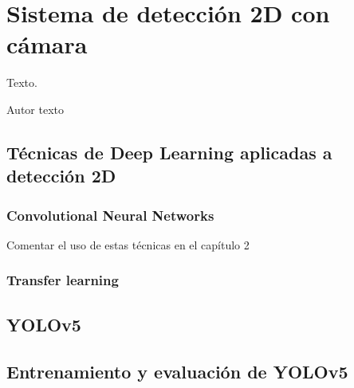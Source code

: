 \chapter{Sistema de detección 2D con cámara}
\label{cha:Sistema de detección 2D con cámara}

\begin{FraseCelebre}
  \begin{Frase}
    Texto.
  \end{Frase}
  \begin{Fuente}
    Autor texto
  \end{Fuente}
\end{FraseCelebre}

\section{Técnicas de Deep Learning aplicadas a detección 2D}
\label{sec:Técnicas de Deep Learning aplicadas a detección 2D}

\subsection{Convolutional Neural Networks}
\label{sec:Convolutional Neural Networks}

Comentar el uso de estas técnicas en el capítulo 2

\subsection{Transfer learning}
\label{sec:Transfer learning}

\section{YOLOv5}
\label{sec:YOLOv5}

\section{Entrenamiento y evaluación de YOLOv5}
\label{sec:Entrenamiento y evaluación de YOLOv5}
